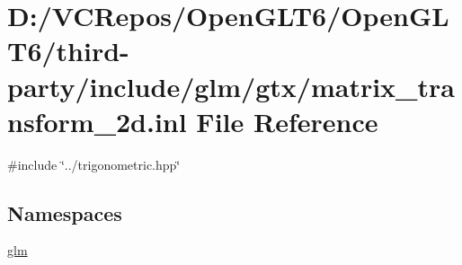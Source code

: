 \hypertarget{matrix__transform__2d_8inl}{}\section{D\+:/\+V\+C\+Repos/\+Open\+G\+L\+T6/\+Open\+G\+L\+T6/third-\/party/include/glm/gtx/matrix\+\_\+transform\+\_\+2d.inl File Reference}
\label{matrix__transform__2d_8inl}
{\ttfamily \#include \char`\"{}../trigonometric.\+hpp\char`\"{}}\newline
\subsection*{Namespaces}
\begin{DoxyCompactItemize}
\item 
 \mbox{\hyperlink{namespaceglm}{glm}}
\end{DoxyCompactItemize}
